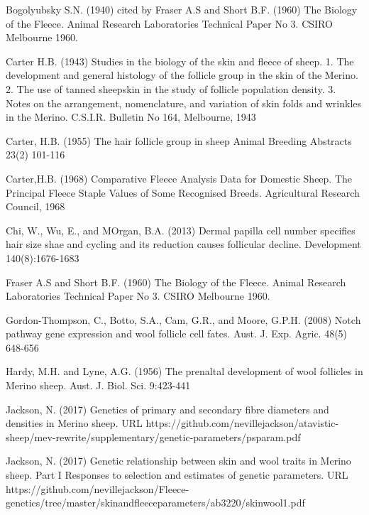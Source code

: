 \documentclass[titlepage]{article}  %
\begin{document}
\clearpage
\begin{thebibliography}{99}

 Bogolyubsky S.N. (1940) cited by Fraser A.S and Short B.F. (1960) The Biology of the Fleece. Animal Research Laboratories Technical Paper No 3. CSIRO Melbourne 1960.


Carter H.B. (1943) Studies in the biology of the skin and fleece of sheep. 1. The development and general histology of the follicle group in the skin of the Merino. 2. The use of tanned sheepskin in the study of follicle population density. 3. Notes on the arrangement, nomenclature, and variation of skin folds and wrinkles in the Merino. C.S.I.R. Bulletin No 164, Melbourne, 1943

Carter, H.B. (1955) The hair follicle group in sheep Animal Breeding Abstracts 23(2) 101-116

Carter,H.B. (1968) Comparative Fleece Analysis Data for Domestic Sheep. The Principal Fleece Staple Values of Some Recognised Breeds. Agricultural Research Council, 1968

Chi, W., Wu, E., and MOrgan, B.A. (2013) Dermal papilla cell number specifies hair size shae and cycling and its reduction causes follicular decline. Development 140(8):1676-1683

Fraser A.S and Short B.F. (1960) The Biology of the Fleece. Animal Research Laboratories Technical Paper No 3. CSIRO Melbourne 1960.

Gordon-Thompson, C., Botto, S.A., Cam, G.R., and Moore, G.P.H. (2008) Notch pathway gene expression and wool follicle cell fates. Aust. J. Exp. Agric. 48(5) 648-656

Hardy, M.H. and Lyne, A.G. (1956) The prenaltal development of wool follicles in Merino sheep. Aust. J. Biol. Sci. 9:423-441

Jackson, N. (2017) Genetics of primary and secondary fibre diameters and densities in Merino sheep. URL https://github.com/nevillejackson/atavistic-sheep/mev-rewrite/supplementary/genetic-parameters/psparam.pdf

Jackson, N. (2017) Genetic relationship between skin and wool traits in Merino sheep. Part I Responses to selection and estimates of genetic parameters. URL https://github.com/nevillejackson/Fleece-genetics/tree/master/skinandfleeceparameters/ab3220/skinwool1.pdf


\end{thebibliography}
\end{document}
